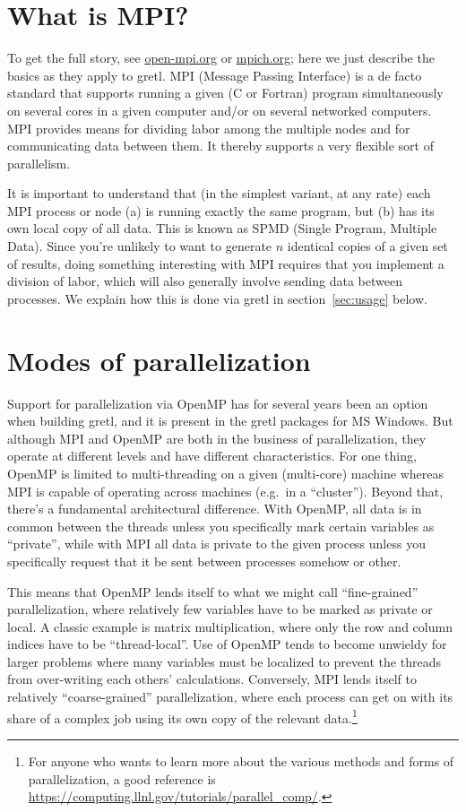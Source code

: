 \documentclass{article}
\begin{document}
\section{What is MPI?}
\label{sec:MPI}

To get the full story, see \url{open-mpi.org} or \url{mpich.org}; here
we just describe the basics as they apply to gretl. MPI (Message
Passing Interface) is a de facto standard that supports running a
given (C or Fortran) program simultaneously on several cores in a
given computer and/or on several networked computers. MPI provides
means for dividing labor among the multiple nodes and for
communicating data between them. It thereby supports a very flexible
sort of parallelism.

It is important to understand that (in the simplest variant, at any
rate) each MPI process or node (a) is running exactly the same
program, but (b) has its own local copy of all data. This is known as
SPMD (Single Program, Multiple Data). Since you're unlikely to want to
generate $n$ identical copies of a given set of results, doing
something interesting with MPI requires that you implement a division
of labor, which will also generally involve sending data between
processes. We explain how this is done via gretl in
section~\ref{sec:usage} below.

\section{Modes of parallelization}
\label{sec:MPI-OMP}

Support for parallelization via \textsf{OpenMP} has for several years
been an option when building gretl, and it is present in the gretl
packages for MS Windows. But although MPI and \textsf{OpenMP} are both
in the business of parallelization, they operate at different levels
and have different characteristics. For one thing, \textsf{OpenMP} is
limited to multi-threading on a given (multi-core) machine whereas MPI
is capable of operating across machines (e.g.\ in a
``cluster''). Beyond that, there's a fundamental architectural
difference. With \textsf{OpenMP}, all data is in common between the
threads unless you specifically mark certain variables as ``private'',
while with MPI all data is private to the given process unless you
specifically request that it be sent between processes somehow or
other.

This means that \textsf{OpenMP} lends itself to what we might call
``fine-grained'' parallelization, where relatively few variables have
to be marked as private or local. A classic example is matrix
multiplication, where only the row and column indices have to be
``thread-local''. Use of \textsf{OpenMP} tends to become unwieldy for
larger problems where many variables must be localized to prevent the
threads from over-writing each others' calculations.  Conversely, MPI
lends itself to relatively ``coarse-grained'' parallelization, where
each process can get on with its share of a complex job using its own
copy of the relevant data.\footnote{For anyone who wants to learn more
  about the various methods and forms of parallelization, a good
  reference is
  \url{https://computing.llnl.gov/tutorials/parallel_comp/}.}
\end{document}
